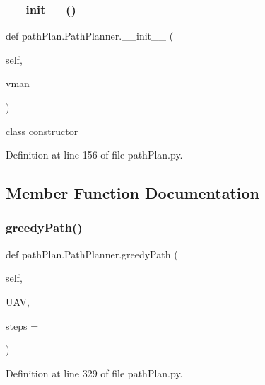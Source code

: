 \subsubsection{\texorpdfstring{\+\_\+\+\_\+init\+\_\+\+\_\+()}{\_\_init\_\_()}}
{\footnotesize\ttfamily def path\+Plan.\+Path\+Planner.\+\_\+\+\_\+init\+\_\+\+\_\+ (\begin{DoxyParamCaption}\item[{}]{self,  }\item[{}]{vman }\end{DoxyParamCaption})}



class constructor 



Definition at line 156 of file path\+Plan.\+py.



\subsection{Member Function Documentation}
\mbox{\label{classpath_plan_1_1_path_planner_aa578a0dcb25eed4782bb660d8b71b731}} 
\subsubsection{\texorpdfstring{greedy\+Path()}{greedyPath()}}
{\footnotesize\ttfamily def path\+Plan.\+Path\+Planner.\+greedy\+Path (\begin{DoxyParamCaption}\item[{}]{self,  }\item[{}]{U\+AV,  }\item[{}]{steps = {} }\end{DoxyParamCaption})}



Definition at line 329 of file path\+Plan.\+py.

\mbox{\label{classpath_plan_1_1_path_planner_abe0f6150b91e41dc9625d29a7005e37d}} 
